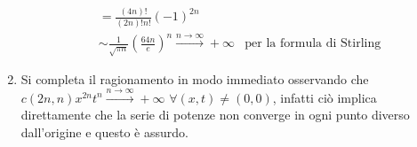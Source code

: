 \begin{example}
\begin{enumerate}
\begin{align*}
 &= \frac{(4n)!}{(2n)!n!} (-1)^{2n} \\
 &\sim \frac{1}{\sqrt{\pi n}}\left(\frac{64n}{e}\right)^n \xrightarrow{n\rightarrow\infty} +\infty  &\text{per la formula di Stirling}
\end{align*}
\item
Si completa il ragionamento in modo immediato osservando che 
$c(2n,n) x^{2n} t ^{n}\xrightarrow{n\rightarrow\infty} +\infty$ $\forall (x,t) \neq (0,0)$, 
infatti ciò implica direttamente che la serie di potenze non converge in ogni punto diverso dall'origine e questo è assurdo.
\end{enumerate}
\end{example}


\begin{example}

\end{example}

